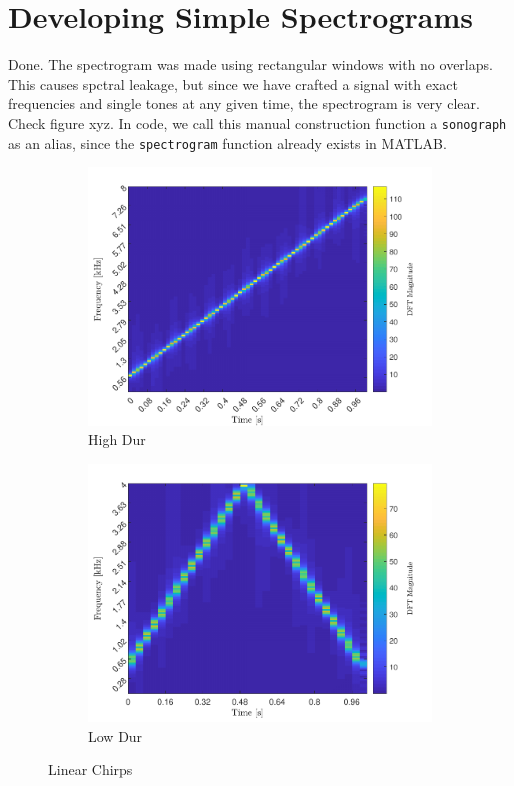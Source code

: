 \documentclass[10pt]{article}
\begin{document}
\section{Developing Simple Spectrograms}
Done. The spectrogram was made using rectangular windows with no overlaps. This causes spctral leakage, but since we have crafted a signal with exact frequencies and single tones at any given time, the spectrogram is very clear. Check figure xyz. In code, we call this manual construction function a \texttt{sonograph} as an alias, since the \texttt{spectrogram} function already exists in \textsc{MATLAB}.

\begin{figure}[ht]
    \centering
    \begin{subfigure}[b]{0.48\textwidth}
        \includegraphics[width=\textwidth]{problem9_sonogram_linear_chirp.pdf}
        \caption{High Dur}
    \end{subfigure}
    \quad
    \begin{subfigure}[b]{0.48\textwidth}
        \includegraphics[width=\textwidth]{problem9_sonogram_subsampled_linear_chirp.pdf}
        \caption{Low Dur}
    \end{subfigure}
    \caption{Linear Chirps\vspace{-0.5cm}}
    \label{linear_chirp_spectrogram}
\end{figure}
\end{document}
